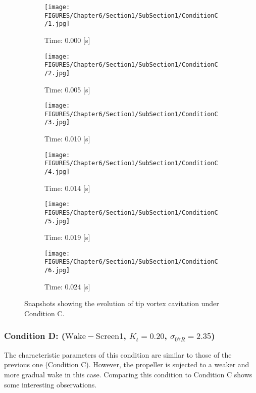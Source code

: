 \begin{figure}[!htb]
    \centering
    \begin{subfigure}[b]{0.31\textwidth}
        \texttt{[image: FIGURES/Chapter6/Section1/SubSection1/ConditionC/1.jpg]}
        \caption{Time: 0.000 [s]}
        \label{fig:0C}
    \end{subfigure}
    \hfill
    \begin{subfigure}[b]{0.31\textwidth}
        \texttt{[image: FIGURES/Chapter6/Section1/SubSection1/ConditionC/2.jpg]}
        \caption{Time: 0.005 [s]}
        \label{fig:5C}
    \end{subfigure}
    \hfill
    \begin{subfigure}[b]{0.31\textwidth}
        \texttt{[image: FIGURES/Chapter6/Section1/SubSection1/ConditionC/3.jpg]}
        \caption{Time: 0.010 [s]}
        \label{fig:10C}
    \end{subfigure}
    \medskip
    \begin{subfigure}[b]{0.31\textwidth}
        \texttt{[image: FIGURES/Chapter6/Section1/SubSection1/ConditionC/4.jpg]}
        \caption{Time: 0.014 [s]}
        \label{fig:14C}
    \end{subfigure}
    \hfill
    \begin{subfigure}[b]{0.31\textwidth}
        \texttt{[image: FIGURES/Chapter6/Section1/SubSection1/ConditionC/5.jpg]}
        \caption{Time: 0.019 [s]}
        \label{fig:19C}
    \end{subfigure}
    \hfill
    \begin{subfigure}[b]{0.31\textwidth}
        \texttt{[image: FIGURES/Chapter6/Section1/SubSection1/ConditionC/6.jpg]}
        \caption{Time: 0.024 [s]}
        \label{fig:24C}
    \end{subfigure}
    \caption{Snapshots showing the evolution of tip vortex cavitation under Condition C.}
    \label{fig:SnapshotC}
\end{figure}

\subsubsection{Condition D: ($\mathrm{Wake-Screen1}$, $K_t = 0.20$, $\sigma_{07R} = 2.35$)}
\label{sez:D}

The characteristic parameters of this condition are similar to those of the previous one (Condition C). However, the propeller is sujected to a weaker and more gradual wake in this case. Comparing this condition to Condition C shows some interesting observations.

